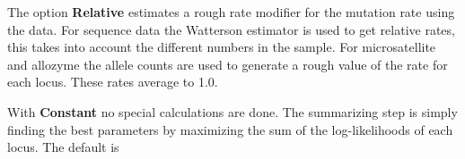 \begin{description}
The option \textbf{ Relative} estimates a rough rate modifier for the mutation rate using the data. For sequence data the Watterson estimator is used to get relative rates, this takes into account the different numbers in the sample. For microsatellite and allozyme the allele counts are used to generate a rough value of the rate for each locus. These rates average to 1.0.

With \textbf{ Constant} no special calculations are done. The summarizing step is simply finding the 
best parameters by maximizing the sum of the log-likelihoods of each locus.
The default is {}

\end{description}




